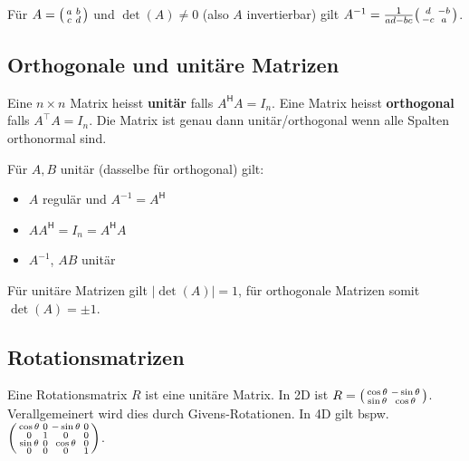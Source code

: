 \documentclass[a4paper,10pt]{article}
\newcommand*{\hermconj}{\mathsf{H}}
\begin{document}
Für $A = \begin{psmallmatrix*}
  a & b \\
  c & d
\end{psmallmatrix*}$ und $\det(A) \neq 0$ (also $A$ invertierbar) gilt $A^{-1} = \frac{1}{ad - bc} \begin{psmallmatrix*}
  d & -b \\
  -c & a
\end{psmallmatrix*}$.

\subsection{Orthogonale und unitäre Matrizen}

Eine $n \times n$ Matrix heisst \textbf{unitär} falls $A^\hermconj A = I_n$. Eine Matrix heisst \textbf{orthogonal} falls $A^\top A = I_n$. Die Matrix ist genau dann unitär/orthogonal wenn alle Spalten orthonormal sind.

Für $A, B$ unitär (dasselbe für orthogonal) gilt:

\begin{itemize}
  \item $A$ regulär und $A^{-1} = A^\hermconj$
  \item $AA^\hermconj = I_n = A^\hermconj A$
  \item $A^{-1}$, $AB$ unitär
\end{itemize}

Für unitäre Matrizen gilt $| \det(A) | = 1$, für orthogonale Matrizen somit $\det(A) = \pm 1$.

\subsection{Rotationsmatrizen}

Eine Rotationsmatrix $R$ ist eine unitäre Matrix. In 2D ist $R = \begin{psmallmatrix*}
  \cos \theta & -\sin \theta \\
  \sin \theta & \cos \theta
\end{psmallmatrix*}$. Verallgemeinert wird dies durch Givens-Rotationen. In 4D gilt bspw. $\begin{psmallmatrix}
  \cos \theta & 0 & -\sin \theta & 0 \\
  0 & 1 & 0 & 0 \\
  \sin \theta & 0 & \cos \theta & 0 \\
  0 & 0 & 0 & 1
\end{psmallmatrix}$.
\end{document}
